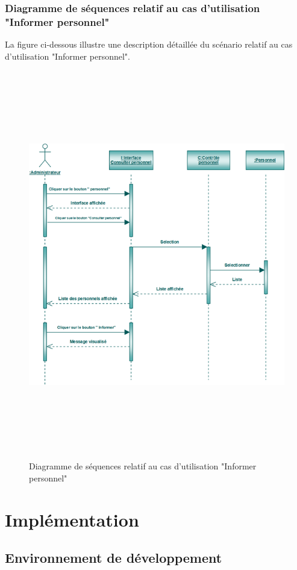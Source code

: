 \documentclass[12 pt ]{report}
\begin{document}
\subsubsection{Diagramme de séquences relatif au cas d’utilisation "Informer personnel" }
La figure ci-dessous illustre une description détaillée du scénario relatif au cas d'utilisation "Informer  personnel". 
\begin{figure}[h]
 \begin{center}
\includegraphics[width= 14 cm ,height= 17cm]{sec_info_per.PNG}
\caption {Diagramme de séquences relatif au cas d’utilisation "Informer personnel"}
\end{center}
\end{figure}
\newpage
\clearpage
\section{Implémentation}
\subsection{Environnement de développement}
\end{document}
